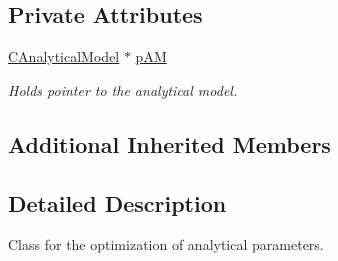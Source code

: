 \subsection*{Private Attributes}
\begin{DoxyCompactItemize}
\item 
\hyperlink{class_go_s_u_m_1_1_c_analytical_model}{C\-Analytical\-Model} $\ast$ \hyperlink{class_go_s_u_m_1_1_c_analytic_parameters_o_p_a6e816818e9632ee073ca158f4242259e}{p\-A\-M}
\begin{DoxyCompactList}\small\item\em Holds pointer to the analytical model. \end{DoxyCompactList}\end{DoxyCompactItemize}
\subsection*{Additional Inherited Members}


\subsection{Detailed Description}
Class for the optimization of analytical parameters. 

